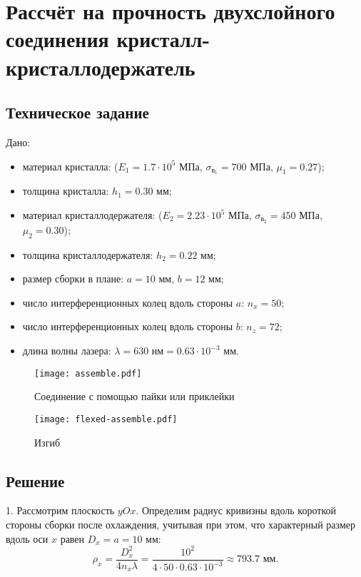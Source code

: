 \chapter{Рассчёт на прочность двухслойного соединения кристалл-кристаллодержатель}

\section{Техническое задание}

Дано: 
\begin{itemize}
    \item материал кристалла:
         ($E_1 = 1.7 \cdot 10^5 \text{ МПа}$, $\sigma_{в_1} = 700 \text{ МПа}$, $\mu_1 = 0.27$);
    \item толщина кристалла:
        $h_1 = 0.30 \text{ мм}$;
    \item материал кристаллодержателя:
         ($E_2 = 2.23 \cdot 10^5 \text{ МПа}$, $\sigma_{в_2} = 450 \text{ МПа}$, $\mu_2 = 0.30$);
    \item толщина кристаллодержателя:
        $h_2 = 0.22 \text{ мм}$;
    \item размер сборки в плане:
        $a = 10 \text{ мм}$, $b = 12 \text{ мм}$;
    \item число интерференционных колец вдоль стороны $a$:
        $n_x = 50$;
    \item число интерференционных колец вдоль стороны $b$:
        $n_z = 72$;
    \item длина волны лазера:
        $\lambda = 630 \text{ нм} = 0.63 \cdot 10^{-3} \text{ мм}$.
\end{itemize}

\begin{figure}[h]
    \centering
    \texttt{[image: assemble.pdf]}
    \caption{Соединение с помощью пайки или приклейки}
\end{figure}

\begin{figure}[h]
    \centering
    \texttt{[image: flexed-assemble.pdf]}
    \caption{Изгиб}
\end{figure}

\section{Решение}

1. Рассмотрим плоскость $yOx$. Определим радиус кривизны вдоль короткой стороны сборки после охлаждения, учитывая при этом, что характерный размер вдоль оси $x$ равен $D_x = a = 10 \text{ мм}$:
\[
    \rho_x = \frac{D_x^2}{4 n_x \lambda} = \frac{10^2}{4 \cdot 50 \cdot 0.63 \cdot 10^{-3}} \approx 793.7 \text{ мм}.
\]

